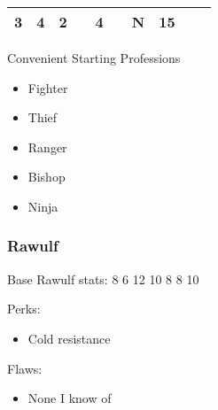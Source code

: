 \documentclass[12pt]{article}
\newcommand{\WviiTwoColumnSetup}{\raggedcolumns\RaggedRight}
\begin{document}
\begin{longtable}[]{@{}llllllllll@{}}
\begin{minipage}[t]{0.06\columnwidth}
3
\strut\end{minipage} &
\begin{minipage}[t]{0.06\columnwidth}\raggedright\strut
4
\strut\end{minipage} &
\begin{minipage}[t]{0.06\columnwidth}\raggedright\strut
2
\strut\end{minipage} &
\begin{minipage}[t]{0.06\columnwidth}\raggedright\strut
\strut\end{minipage} &
\begin{minipage}[t]{0.06\columnwidth}\raggedright\strut
4
\strut\end{minipage} &
\begin{minipage}[t]{0.06\columnwidth}\raggedright\strut
\strut\end{minipage} &
\begin{minipage}[t]{0.07\columnwidth}\raggedright\strut
N
\strut\end{minipage} &
\begin{minipage}[t]{0.08\columnwidth}\raggedright\strut
15
\strut\end{minipage}\tabularnewline
\bottomrule
\end{longtable}

Convenient Starting Professions

\begin{multicols}{2}\WviiTwoColumnSetup
\begin{itemize}
\item
  Fighter
\item
  Thief
\item
  Ranger
\item
  Bishop
\item
  Ninja
\end{itemize}
\end{multicols}

\subsubsection{Rawulf}\label{rawulf}

Base Rawulf stats: 8 6 12 10 8 8 10

\begin{multicols}{2}\WviiTwoColumnSetup
Perks:

\begin{itemize}
\item
  Cold resistance
\end{itemize}
\columnbreak

Flaws:

\begin{itemize}

\item
  None I know of
\end{itemize}
\end{multicols}
\end{document}
